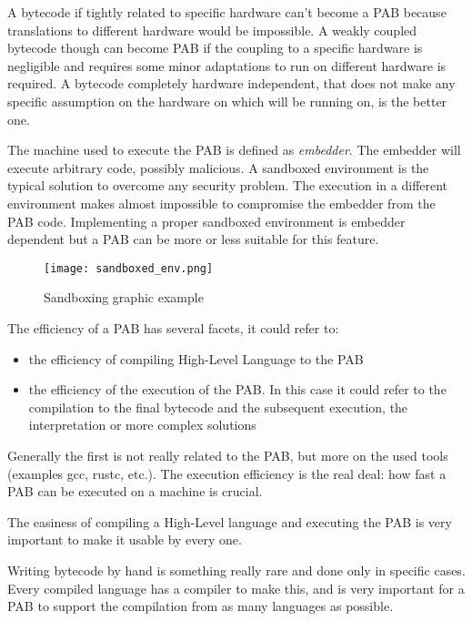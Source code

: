 \begin{description}[style=nextline]
  \item[Hardware Independence]
        A bytecode if tightly related to specific hardware can't become a PAB because translations to different hardware would be impossible. A weakly coupled bytecode though can become PAB if the coupling to a specific hardware is negligible and requires some minor adaptations to run on different hardware is required. A bytecode completely hardware independent, that does not make any specific assumption on the hardware on which will be running on, is the better one.
  \item[Sandboxing]
        The machine used to execute the PAB is defined as \textit{embedder}. The embedder will execute arbitrary code, possibly malicious.  A sandboxed environment is the typical solution to overcome any security problem. The execution in a different environment makes almost impossible to compromise the embedder from the PAB code. Implementing a proper sandboxed environment is embedder dependent but a PAB can be more or less suitable for this feature.

        \begin{figure}[h]
          \centering
          \texttt{[image: sandboxed\_env.png]}
          \caption{Sandboxing graphic example}
          \label{fig:Sandboxing graphic example}
        \end{figure}

  \item[Efficiency]
        The efficiency of a PAB has several facets, it could refer to:

        \begin{itemize}
          \item the efficiency of compiling High-Level Language to the PAB
          \item the efficiency of the execution of the PAB. In this case it could refer to the compilation to the final bytecode and the subsequent execution, the interpretation or more complex solutions
        \end{itemize}

        Generally the first is not really related to the PAB, but more on the used tools (examples gcc, rustc, etc.). The execution efficiency is the real deal: how fast a PAB can be executed on a machine is crucial.
  \item[Tool Simplicity]
        The easiness of compiling a High-Level language and  executing the PAB is very important to make it usable by every one.
  \item[Support as Compilation Target]
        Writing bytecode by hand is something really rare and done only in specific cases. Every compiled language has a compiler to make this, and is very important for a PAB to support the compilation from as many languages as possible.
\end{description}

